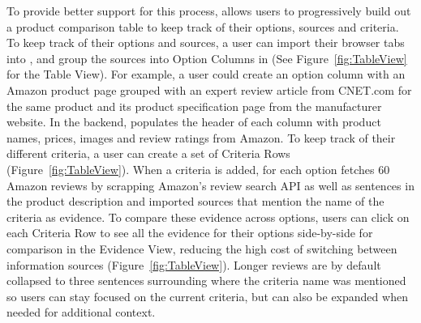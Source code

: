 To provide better support for this process, \SYSTEM allows users to progressively build out a product comparison table to keep track of their options, sources and criteria. To keep track of their options and sources, a user can import their browser tabs into \SYSTEM, and group the sources into Option Columns in \SYSTEM (See Figure~\ref{fig:TableView} for the Table View). For example, a user could create an option column with an Amazon product page grouped with an expert review article from CNET.com for the same product and its product specification page from the manufacturer website. In the backend, \SYSTEM populates the header of each column with product names, prices, images and review ratings from Amazon. To keep track of their different criteria, a user can create a set of Criteria Rows (Figure~\ref{fig:TableView}). When a criteria is added, for each option \SYSTEM fetches 60 Amazon reviews by scrapping Amazon’s review search API as well as sentences in the product description and imported sources that mention the name of the criteria as evidence. To compare these evidence across options, users can click on each Criteria Row to see all the evidence for their options side-by-side for comparison in the Evidence View, reducing the high cost of switching between information sources (Figure~\ref{fig:TableView}). Longer reviews are by default collapsed to three sentences surrounding where the criteria name was mentioned so users can stay focused on the current criteria, but can also be expanded when needed for additional context. 


